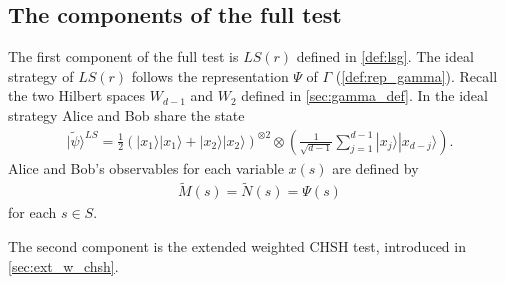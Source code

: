 \documentclass[11pt,letterpaper]{article}
\newcommand{\ket}[1]{|#1\rangle}
\newcommand{\x}{\otimes}
\newcommand{\1}{\mathbb{1}}
\newcommand{\LS}{LS}
\newcommand{\tM}{\tilde{M}}
\newcommand{\tN}{\tilde{N}}
\newcommand{\tpsi}{\tilde{\psi}}
\theoremstyle{definition}
\begin{document}
\subsection{The components of the full test}
\label{sec:tests}

The first component of the full test is $\LS(r)$ defined in
\cref{def:lsg}.
The ideal strategy of $\LS(r)$ follows the representation $\Psi$ of $\Gamma$ (\cref{def:rep_gamma}).
Recall the two Hilbert spaces $W_{d-1}$ and $W_2$ defined in \cref{sec:gamma_def}. 
In the ideal strategy Alice and Bob share the state 
\begin{align}
    \label{eq:ideal_st_ls}
        \ket{\tpsi}^{\LS} = \frac{1}{2} (\ket{x_1}\ket{x_1} + \ket{x_2}\ket{x_2})^{\x 2} \x \left(\frac{1}{\sqrt{d-1}} \sum_{j=1}^{d-1} \ket{x_j}\ket{x_{d-j}}\right).
\end{align}
Alice and Bob's observables for each variable $x(s)$ are
defined by
\begin{align*}
    \tM(s) = \tN(s) = \Psi(s) 
\end{align*}
for each $s \in S$.


The second component is the extended weighted CHSH test, introduced in \cref{sec:ext_w_chsh}.
\end{document}
